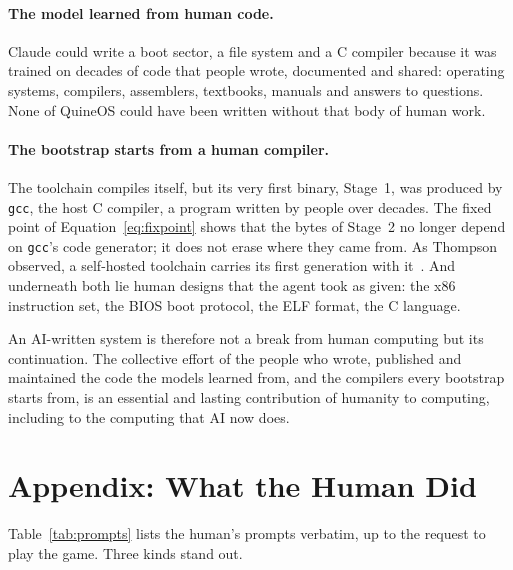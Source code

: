 \documentclass{article}
\newcommand{\sysname}{QuineOS}
\begin{document}
\paragraph{The model learned from human code.} Claude could write a boot sector, a file
system and a C compiler because it was trained on decades of code that people wrote,
documented and shared: operating systems, compilers, assemblers, textbooks, manuals and
answers to questions. None of \sysname{} could have been written without that body of
human work.

\paragraph{The bootstrap starts from a human compiler.} The toolchain compiles itself, but
its very first binary, Stage~1, was produced by \texttt{gcc}, the host C compiler, a
program written by people over decades. The fixed point of Equation~\eqref{eq:fixpoint}
shows that the bytes of Stage~2 no longer depend on \texttt{gcc}'s code generator; it does
not erase where they came from. As Thompson observed, a self-hosted toolchain carries its
first generation with it~\cite{thompson1984trusting}. And underneath both lie human
designs that the agent took as given: the x86 instruction set, the BIOS boot protocol, the
ELF format, the C language.

An AI-written system is therefore not a break from human computing but its continuation.
The collective effort of the people who wrote, published and maintained the code the
models learned from, and the compilers every bootstrap starts from, is an essential and
lasting contribution of humanity to computing, including to the computing that AI now
does.




\appendix

\section*{Appendix: What the Human Did}\label{sec:human}

Table~\ref{tab:prompts} lists the human's prompts verbatim, up to the request to play the
game. Three kinds stand out.
\end{document}
